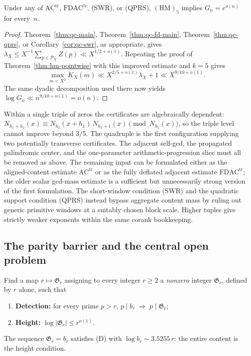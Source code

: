 \begin{corollary}[Moment threshold $k=5$]
Under any of $\mathrm{AC}^{\mathrm{tr}}$,
$\mathrm{FDAC}^{\mathrm{tr}}$, \textup{(SWR)}, or \textup{(QPRS)},
$(\mathrm{HM})_5$ implies
$G_n=e^{o(n)}$ for every~$n$.
\end{corollary}

\begin{proof}
Theorem~\ref{thm:qc-main}, Theorem~\ref{thm:qc-fd-main},
Theorem~\ref{thm:qc-qprs}, or Corollary~\ref{cor:qc-swr}, as appropriate,
gives
$\lambda_X\le X^{-1}\sum_{p\in\mathcal P_X}Z(p)
\ll X^{1/2+o(1)}$.  Repeating the proof of
Theorem~\ref{thm:hm-pointwise} with this improved estimate and $k=5$
gives
\[
 \max_{m<X^2}K_X(m)\ll X^{2/5+o(1)}\lambda_X+1
 \ll X^{9/10+o(1)}.
\]
The same dyadic decomposition used there now yields
$\log G_n\ll n^{9/10+o(1)}=o(n)$.
\end{proof}

\begin{remark}
\label{rem:qc-corank-terminal}
Within a single triple of zeros the certificates are
algebraically dependent:
$N_{h_1+h_2}(x)\equiv N_{h_2}(x{+}h_1)\,N_{h_1+1}(x)
\pmod{N_{h_1}(x)}$,
so the triple level cannot improve beyond $3/5$.
The quadruple is the first configuration supplying two potentially
transverse certificates.  The adjacent self-gcd, the propagated
palindromic center, and the one-parameter arithmetic-progression slice
must all be removed as above.  The remaining input can be formulated
either as the aligned-content estimate $\mathrm{AC}^{\mathrm{tr}}$ or
as the fully deflated adjacent estimate
$\mathrm{FDAC}^{\mathrm{tr}}$; the older scalar gcd-mass estimate is a
sufficient but unnecessarily strong version of the first formulation.
The short-window condition \textup{(SWR)} and the quadratic support condition
\textup{(QPRS)} instead bypass aggregate content mass by ruling out generic
primitive windows at a suitably chosen block scale.
Higher tuples give strictly weaker exponents within the same corank
bookkeeping.
\end{remark}

\subsection{The parity barrier and the central open problem}

\begin{openproblem}\label{op:parity}
Find a map $r\mapsto\mathfrak G_r$ assigning to every integer $r\ge2$ a
\emph{nonzero} integer $\mathfrak G_r$, defined by $r$ alone, such that
\begin{enumerate}
\item[\textup{(D)}] \textbf{Detection:} for every prime $p>r$,
  $p\mid b_r\;\Longrightarrow\;p\mid\mathfrak G_r$;
\item[\textup{(H)}] \textbf{Height:} $\log|\mathfrak G_r|\le r^{o(1)}$.
\end{enumerate}
The sequence $\mathfrak G_r=b_r$ satisfies \textup{(D)} with
$\log b_r\sim3.5255\,r$: the entire content is the height condition.
\end{openproblem}

